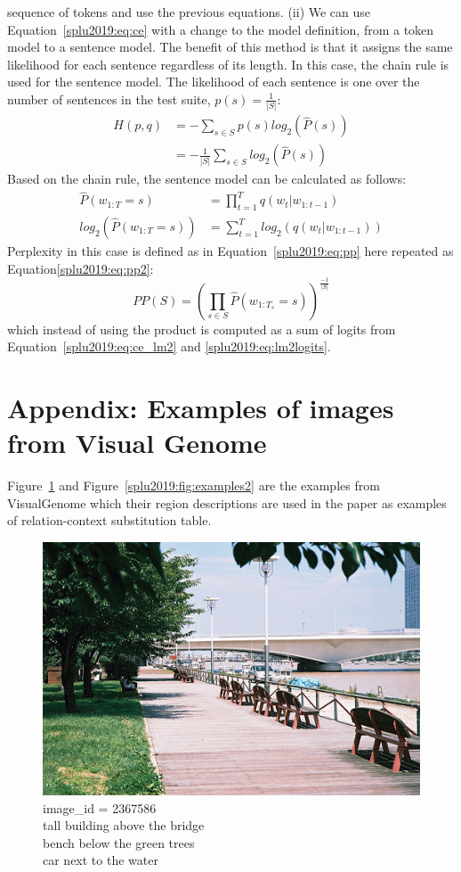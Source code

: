 sequence of tokens and use the previous equations. (ii) We can use
Equation~\ref{splu2019:eq:ce} with a change to the model definition, from a token model
to a sentence model. The benefit of this method is that it assigns the same
likelihood for each sentence regardless of its length. In this case, the chain
rule is used for the sentence model. The likelihood of each sentence is one
over the number of sentences in the test suite, $p(s)=\frac{1}{|S|}$:
\begin{align}\label{splu2019:eq:ce_lm2}
H(p, q) &= - \sum_{s \in S}{p(s) log_2(\hat{P}(s))} \\
&= - \frac{1}{|S|} \sum_{s \in S}{log_2(\hat{P}(s))}
\end{align}
Based on the chain rule, the sentence model can be calculated as follows:
\begin{align}\label{splu2019:eq:lm2}
\hat{P}(w_{1:T}=s) &= \prod_{t = 1}^{T}{q(w_t|w_{1:t-1})} \\ \label{splu2019:eq:lm2logits}
log_2(\hat{P}(w_{1:T}=s)) &= \sum_{t = 1}^{T}{log_2(q(w_t|w_{1:t-1}))}
\end{align}
Perplexity in this case is defined as in Equation~\ref{splu2019:eq:pp} here repeated as
Equation\ref{splu2019:eq:pp2}:
\begin{equation}\label{splu2019:eq:pp2}
PP(S) =  (\prod_{s \in S}{\hat{P}(w_{1:T_s}=s)})^{\frac{-1}{|S|}}
\end{equation}
\noindent which instead of using the product is computed as a sum of
logits from Equation~\ref{splu2019:eq:ce_lm2} and \ref{splu2019:eq:lm2logits}.


\section{Appendix: Examples of images from Visual Genome}\label{splu2019:sec:appendix-image}
Figure~\ref{splu2019:fig:examples1} and Figure~\ref{splu2019:fig:examples2} are the examples from VisualGenome which their region descriptions are used in the paper as examples of relation-context substitution table. 
\begin{figure}[h!]
	\centering
	\includegraphics[width=0.65\linewidth]{studies/splu2019/figures/2367586.jpg}
	\caption{
		image\_id = 2367586 \\
		tall building above the bridge \\
		bench below the green trees \\
		car next to the water}\label{splu2019:fig:examples1}
\end{figure}

